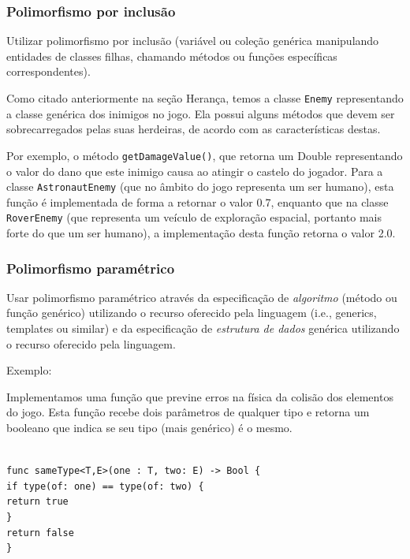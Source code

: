\documentclass[rel_mlp]{iiufrgs}
\newcommand\tab[1][1cm]{\hspace*{#1}}
\begin{document}

\subsubsection{Polimorfismo por inclusão}

Utilizar polimorfismo por inclusão (variável ou coleção genérica manipulando entidades de classes filhas, chamando métodos ou funções específicas correspondentes).

Como citado anteriormente na seção Herança, temos a classe \texttt{Enemy} representando a classe genérica dos inimigos no jogo. Ela possui alguns métodos que devem ser sobrecarregados pelas suas herdeiras, de acordo com as características destas.

Por exemplo, o método \texttt{getDamageValue()}, que retorna um Double representando o valor do dano que este inimigo causa ao atingir o castelo do jogador. Para a classe \texttt{AstronautEnemy} (que no âmbito do jogo representa um ser humano), esta função é implementada de forma a retornar o valor 0.7, enquanto que na classe \texttt{RoverEnemy} (que representa um veículo de exploração espacial, portanto mais forte do que um ser humano), a implementação desta função retorna o valor 2.0.


\subsubsection{Polimorfismo paramétrico}

Usar polimorfismo paramétrico através da especificação de \textit{algoritmo} (método ou função genérico) utilizando o recurso oferecido pela linguagem (i.e., generics, templates ou similar) e da especificação de \textit{estrutura de dados} genérica utilizando o recurso oferecido pela linguagem.

Exemplo:

Implementamos uma função que previne erros na física da colisão dos elementos do jogo. Esta função recebe dois parâmetros de qualquer tipo e retorna um booleano que indica se seu tipo (mais genérico) é o mesmo.

\texttt{\\func sameType<T,E>(one : T, two: E) -> Bool \{\\\tab if type(of: one) == type(of: two) \{\\\tab \tab return true\\\tab\}\\\tab return false\\\}}
\end{document}
